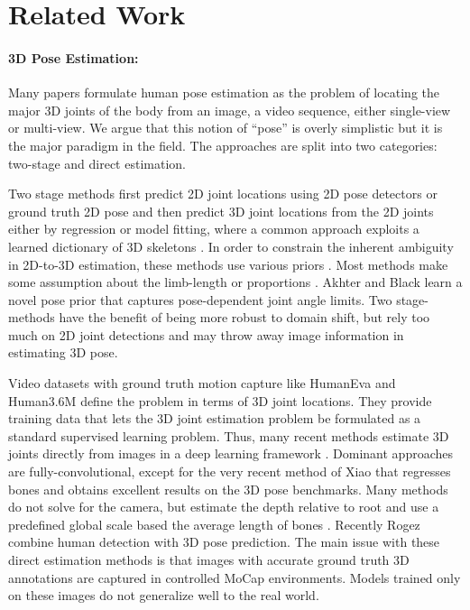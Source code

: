 \documentclass[10pt,twocolumn,letterpaper]{article}
\begin{document}
 \section{Related Work}
\label{sec:related}
\paragraph{3D Pose Estimation:} 
Many papers formulate human pose estimation as the problem of locating
the major 3D joints of the body from an image, a video sequence, either single-view or
multi-view. 
We argue that this notion of ``pose'' is overly simplistic but it is
the major paradigm in the field. 
The approaches are split into two categories: two-stage and direct estimation.

Two stage methods first predict 2D joint locations using 2D pose detectors 
\cite{hourglass,Wei:CVPR:2016,Zhou:2016a} or ground truth 2D pose and
then predict 3D joint locations from
the 2D joints either by regression \cite{Martinez2017,moreno20163d} or model fitting,
where a common approach exploits a learned dictionary of 3D skeletons \cite{Akhter, ramakrishna2012reconstructing,Fish2017,Sanzari2016,Zhou:2015b,Zhou:2016a}.
In order to constrain the inherent ambiguity in 2D-to-3D estimation, these
methods use various priors \cite{Taylor:2000}. Most
methods make some assumption about the limb-length or proportions
\cite{BarronKakadiaris2001,Lee1985,Parameswaran:CVPR:2004,ramakrishna2012reconstructing}. Akhter
and Black \cite{Akhter} learn a novel pose prior that captures
pose-dependent joint angle limits. Two stage-methods have the benefit of being
more robust to domain shift, but rely too much on 2D joint detections
and may throw away image information in estimating 3D pose. 

Video datasets with ground truth motion capture like HumanEva
\cite{HumanEva:2010} and Human3.6M \cite{Human36m:2014} define the
problem in terms of 3D joint locations. 
They provide training data that lets the 3D joint estimation
problem be formulated as a standard supervised learning problem. 
Thus, many recent methods estimate 3D joints directly from images in a deep
learning framework \cite{Pavlakos,Tekin2017,Tome_2017_CVPR,Xingyi2017,Xingyi2016}. Dominant approaches are
fully-convolutional, except for the very recent method of Xiao \etal
\cite{Xiao2017} that regresses bones and obtains excellent results on the 3D
pose benchmarks. Many methods do not solve for the camera, but estimate the depth relative
to root and use a predefined global scale based the average length of bones
\cite{Pavlakos,Xingyi2017,Xingyi2016}. Recently Rogez \etal \cite{Rogez} combine human detection
with 3D pose prediction. The main issue with these direct estimation methods is
that images with accurate ground truth 3D annotations are captured in
controlled MoCap environments. Models trained only on these images do
not generalize well to
the real world.
\end{document}
